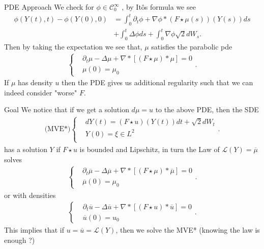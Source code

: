 \documentclass[10pt]{beamer}
\begin{document}
\begin{frame}{PDE Approach}
  We check for $\phi  \in  \mathcal{C}_0^{\infty} $ , by It\^os formula we see
\begin{align*}
  \phi(Y(t),t) - \phi(Y(0),0)  &= \int_0^{t} \partial_t \phi + \nabla \phi*(F\star \mu(s))(Y(s)) ds\\
                               &+ \int_0^{t} \Delta \phi  ds + \int_0^{t} \nabla \phi \sqrt{2}dW_s  
.\end{align*}
Then by taking the expectation we see that, $\mu $ satisfies the parabolic pde 
\begin{align*}
  \begin{cases}
    &\partial_t \mu  - \Delta \mu  + \nabla * [(F\star \mu)*\mu ] = 0 \\
    &\mu(0) = \mu_0
  \end{cases}
.\end{align*}
If $\mu$ has density $u$ then the PDE gives us additional regularity such that we can indeed consider 
"worse" $F$.
\end{frame}
\begin{frame}{Goal}
 We notice that if we get a solution $d\mu  = u$ to the above PDE, then the SDE
 \begin{align*}
\text{(MVE*)} \begin{cases}
  &d Y(t) =  (F \star  u)(Y(t)) dt + \sqrt{2} dW_t\\
  &Y(0)  = \xi \in  L^{2}  \\
\end{cases}
 .\end{align*}
 has a solution $Y$ if $F \star u$ is bounded and Lipschitz, in turn the Law of $\mathcal{L}(Y) = \overline{\mu } $ solves 
 \begin{align*}
  \begin{cases}
    &\partial_t \overline{\mu}   - \Delta \overline{\mu}  + \nabla * [(F\star \mu)*\overline{\mu} ] = 0 \\
    &\overline{\mu}(0)  = \mu_0
  \end{cases}
 .\end{align*}
 or with densities 
\begin{align*}
  \begin{cases}
    &\partial_t \overline{u}   - \Delta \overline{u}  + \nabla * [(F\star u)*\overline{u} ] = 0 \\
    &\overline{u}(0)  = u_0
  \end{cases}
 .\end{align*}
 This implies that if $u=\overline{u} = \mathcal{L}(Y) $, then we solve the MVE* (knowing the law is enough ?)
\end{frame}
\end{document}
